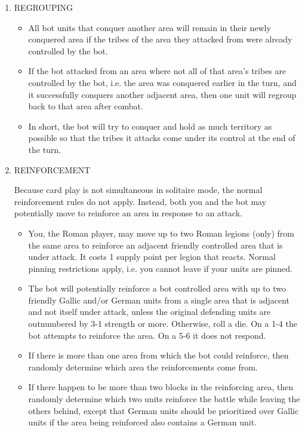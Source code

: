 \begin{enumerate}
  \item REGROUPING
  \begin{itemize}
    \item All bot units that conquer another area will remain in their newly conquered area if the tribes of the area they attacked from were already controlled by the bot.
    
    \item If the bot attacked from an area where not all of that area's tribes are controlled by the bot, i.e. the area was conquered earlier in the turn, and it successfully conquers another adjacent area, then one unit will regroup back to that area after combat.
    
    \item In short, the bot will try to conquer and hold as much territory as possible so that the tribes it attacks come under its control at the end of the turn.
  \end{itemize}
  
  \item REINFORCEMENT
  
  Because card play is not simultaneous in solitaire mode, the normal reinforcement rules do not apply. Instead, both you and the bot may potentially move to reinforce an area in response to an attack.
  
  \begin{itemize}
    \item You, the Roman player, may move up to two Roman legions (only) from the same area to reinforce an adjacent friendly controlled area that is under attack. It costs 1 supply point per legion that reacts. Normal pinning restrictions apply, i.e. you cannot leave if your units are pinned.
    
    \item The bot will potentially reinforce a bot controlled area with up to two friendly Gallic and/or German units from a single area that is adjacent and not itself under attack, unless the original defending units are outnumbered by 3-1 strength or more. Otherwise, roll a die. On a 1-4 the bot attempts to reinforce the area. On a 5-6 it does not respond.
    
    \item If there is more than one area from which the bot could reinforce, then randomly determine which area the reinforcements come from.
    
    \item If there happen to be more than two blocks in the reinforcing area, then randomly determine which two units reinforce the battle while leaving the others behind, except that German units should be prioritized over Gallic units if the area being reinforced also contains a German unit.
    

\end{itemize}
\end{enumerate}
